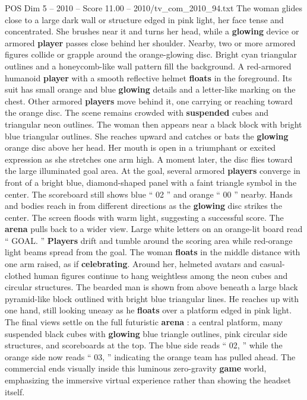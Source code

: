 \begin{textsample}{POS Dim 5 – 2010 – Score 11.00 – 2010/tv\_com\_2010\_94.txt}
The woman glides close to a large dark wall or structure edged in pink light, her face tense and concentrated.
She brushes near it and turns her head, while a \textbf{glowing} device or armored \textbf{player} passes close behind her shoulder.
Nearby, two or more armored figures collide or grapple around the orange-glowing disc.
Bright cyan triangular outlines and a honeycomb-like wall pattern fill the background.
A red-armored humanoid \textbf{player} with a smooth reflective helmet \textbf{floats} in the foreground.
Its suit has small orange and blue \textbf{glowing} details and a letter-like marking on the chest.
Other armored \textbf{players} move behind it, one carrying or reaching toward the orange disc.
The scene remains crowded with \textbf{suspended} cubes and triangular neon outlines.
The woman then appears near a black block with bright blue triangular outlines.
She reaches upward and catches or bats the \textbf{glowing} orange disc above her head.
Her mouth is open in a triumphant or excited expression as she stretches one arm high.
A moment later, the disc flies toward the large illuminated goal area.
At the goal, several armored \textbf{players} converge in front of a bright blue, diamond-shaped panel with a faint triangle symbol in the center.
The scoreboard still shows blue “ 02 ” and orange “ 00 ” nearby.
Hands and bodies reach in from different directions as the \textbf{glowing} disc strikes the center.
The screen floods with warm light, suggesting a successful score.
The \textbf{arena} pulls back to a wider view.
Large white letters on an orange-lit board read “ GOAL. ” \textbf{Players} drift and tumble around the scoring area while red-orange light beams spread from the goal.
The woman \textbf{floats} in the middle distance with one arm raised, as if \textbf{celebrating}.
Around her, helmeted avatars and casual-clothed human figures continue to hang weightless among the neon cubes and circular structures.
The bearded man is shown from above beneath a large black pyramid-like block outlined with bright blue triangular lines.
He reaches up with one hand, still looking uneasy as he \textbf{floats} over a platform edged in pink light.
The final views settle on the full futuristic \textbf{arena} : a central platform, many suspended black cubes with \textbf{glowing} blue triangle outlines, pink circular side structures, and scoreboards at the top.
The blue side reads “ 02, ” while the orange side now reads “ 03, ” indicating the orange team has pulled ahead.
The commercial ends visually inside this luminous zero-gravity \textbf{game} world, emphasizing the immersive virtual experience rather than showing the headset itself.

\end{textsample}
